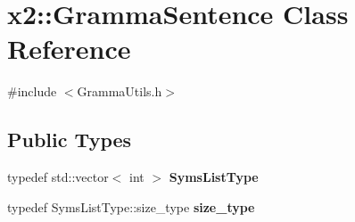 \hypertarget{classx2_1_1_gramma_sentence}{}\section{x2\+:\+:Gramma\+Sentence Class Reference}
\label{classx2_1_1_gramma_sentence}


{\ttfamily \#include $<$Gramma\+Utils.\+h$>$}

\subsection*{Public Types}
\begin{DoxyCompactItemize}
\item 
\mbox{\label{classx2_1_1_gramma_sentence_a2ac136621c50e96f7d126eec257ebddd}} 
typedef std\+::vector$<$ int $>$ {\bfseries Syms\+List\+Type}
\item 
\mbox{\label{classx2_1_1_gramma_sentence_abece966f6435f072c4535f81b8f58115}} 
typedef Syms\+List\+Type\+::size\+\_\+type {\bfseries size\+\_\+type}
\end{DoxyCompactItemize}
